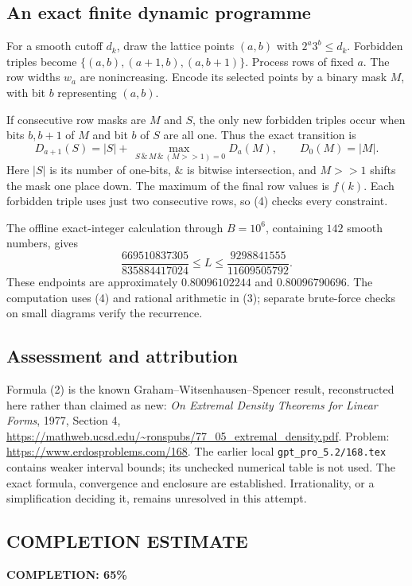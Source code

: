 \subsection*{An exact finite dynamic programme}
For a smooth cutoff $d_k$, draw the lattice points $(a,b)$ with $2^a3^b\le d_k$. Forbidden triples become
$\{(a,b),(a+1,b),(a,b+1)\}$.
Process rows of fixed $a$. The row widths $w_a$ are nonincreasing. Encode its selected points by a binary mask $M$, with bit $b$ representing $(a,b)$.

If consecutive row masks are $M$ and $S$, the only new forbidden triples occur when bits $b,b+1$ of $M$ and bit $b$ of $S$ are all one. Thus the exact transition is
\[
 D_{a+1}(S)=|S|+
 \max_{\;S\,\&\,M\,\&\,(M\!>\!>1)=0}D_a(M),
 \qquad D_0(M)=|M|.
 \tag{4}
\]
Here $|S|$ is its number of one-bits, $\&$ is bitwise intersection, and
$M\!>\!>1$ shifts the mask one place down. The maximum of the final row values is $f(k)$. Each forbidden triple uses just two consecutive rows, so (4) checks every constraint.

The offline exact-integer calculation through $B=10^6$, containing $142$ smooth numbers, gives
\[
 \frac{669510837305}{835884417024}
 \le L\le
 \frac{9298841555}{11609505792}.
 \tag{5}
\]
These endpoints are approximately $0.80096102244$ and $0.80096790696$.
The computation uses (4) and rational arithmetic in (3); separate brute-force checks on small diagrams verify the recurrence.

\subsection*{Assessment and attribution}
Formula (2) is the known Graham--Witsenhausen--Spencer result, reconstructed here rather than claimed as new: \emph{On Extremal Density Theorems for Linear Forms}, 1977, Section 4, \url{https://mathweb.ucsd.edu/~ronspubs/77_05_extremal_density.pdf}. Problem: \url{https://www.erdosproblems.com/168}. The earlier local \texttt{gpt\_pro\_5.2/168.tex} contains weaker interval bounds; its unchecked numerical table is not used.
The exact formula, convergence and enclosure are established. Irrationality, or a simplification deciding it, remains unresolved in this attempt.
\subsection*{COMPLETION ESTIMATE}
\textbf{COMPLETION: 65\%}
